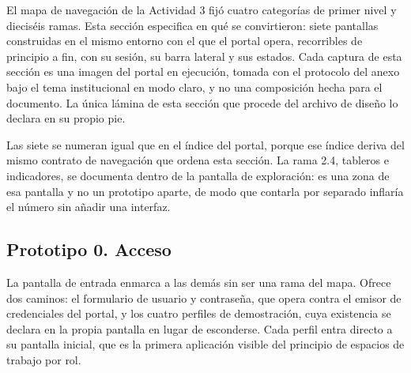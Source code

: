 %
%


El mapa de navegación de la Actividad 3 fijó cuatro categorías de primer nivel y dieciséis ramas.
Esta sección especifica en qué se convirtieron: siete pantallas construidas en el mismo entorno con
el que el portal opera, recorribles de principio a fin, con su sesión, su barra lateral y sus
estados. Cada captura de esta sección es una imagen del portal en ejecución, tomada con el
protocolo del anexo bajo el tema institucional en modo claro, y no una composición hecha para el
documento. La única lámina de esta sección que procede del archivo de diseño lo declara en su
propio pie.

Las siete se numeran igual que en el índice del portal, porque ese índice deriva del mismo contrato
de navegación que ordena esta sección. La rama 2.4, tableros e indicadores, se documenta dentro de
la pantalla de exploración: es una zona de esa pantalla y no un prototipo aparte, de modo que
contarla por separado inflaría el número sin añadir una interfaz.

\clearpage
\subsection{Prototipo 0. Acceso}

La pantalla de entrada enmarca a las demás sin ser una rama del mapa. Ofrece dos caminos: el
formulario de usuario y contraseña, que opera contra el emisor de credenciales del portal, y los
cuatro perfiles de demostración, cuya existencia se declara en la propia pantalla en lugar de
esconderse. Cada perfil entra directo a su pantalla inicial, que es la primera aplicación visible
del principio de espacios de trabajo por rol.

